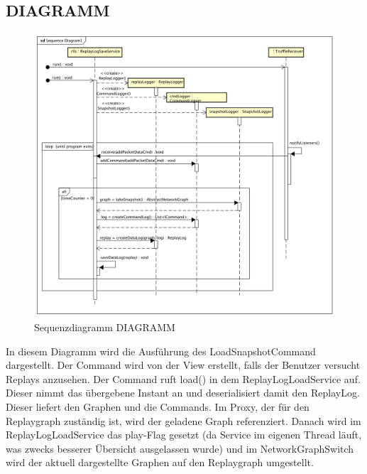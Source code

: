 \subsection{DIAGRAMM}
\begin{figure}[H]
  \centering
  \includegraphics[width=\textwidth]{../diagramimages/sd_createsnapshot.png}
  \caption[Sequenzdiagramm DIAGRAMM]{Sequenzdiagramm DIAGRAMM}
\end{figure}

In diesem Diagramm wird die Ausführung des LoadSnapshotCommand dargestellt. Der Command wird von der View erstellt, falls der Benutzer versucht Replays anzusehen. Der Command ruft load() in dem ReplayLogLoadService auf. Dieser nimmt das übergebene Instant an und deserialisiert damit den ReplayLog. Dieser liefert den Graphen und die Commands. Im Proxy, der für den Replaygraph zuständig ist, wird der geladene Graph referenziert. Danach wird im ReplayLogLoadService das play-Flag gesetzt (da Service im eigenen Thread läuft, was zwecks besserer Übersicht ausgelassen wurde) und im NetworkGraphSwitch wird der aktuell dargestellte Graphen auf den Replaygraph umgestellt.